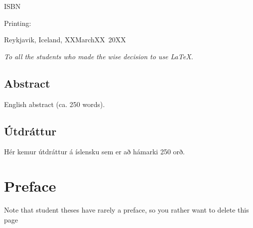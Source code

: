 \documentclass[a4paper,12pt,twoside,BCOR=10mm]{scrbook}
\def\thesisyear{20XX}       					%
\def\thesismonth{XXMarchXX}					%
\def\thesisISBN{}           					%
\def\thesisprinting{}						%
\begin{document}
\begin{titlepage}
  \ifx\thesisISBN\empty %
  \else
  ISBN~\thesisISBN
  \fi
  
  \ifx\thesisprinting\empty %
  \else
  Printing: \thesisprinting \\
  \fi


  Reykjavik, Iceland, \thesismonth~\thesisyear \\
  

  \newpage %

  \thispagestyle{empty} \mbox{}

  \vfill

  \begin{center}
    \textit{
      To all the students who made the wise decision to use \LaTeX. %
    }
  \end{center} \vspace*{5cm}

  \vfill 


\end{titlepage}

\cleardoublepage


\setcounter{page}{5}

\section*{\huge Abstract}
English abstract (ca. 250 words).

\vfill \vspace*{1cm}

\section*{\huge Útdráttur}
Hér kemur útdráttur á íslensku sem er að hámarki 250 orð.
\vfill

\newpage %



\chapter*{Preface}
Note that student theses have rarely a preface, so you rather want to delete this page
\end{document}
